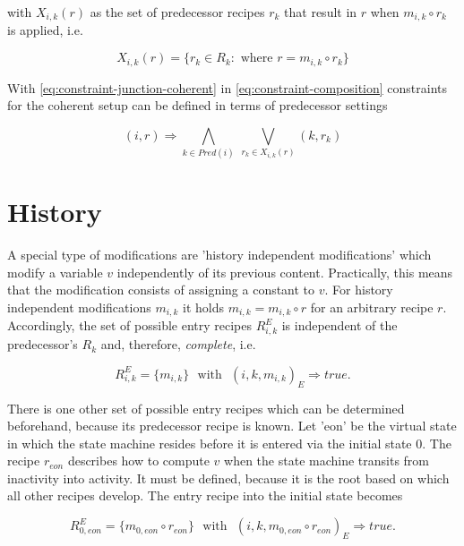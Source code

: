 \documentclass[12pt,a4paper]{scrartcl}
\begin{document}
with $X_{i,k}(r)$ as the set of predecessor recipes $r_k$ that result in $r$
when $m_{i,k}\circ r_k$ is applied, i.e.

\begin{equation} \label{eq:condition-result-origin-set}
    X_{i,k}(r) = \{ r_k\in R_k: \mbox{ where } r = m_{i,k}\circ r_k \}
\end{equation}

With \eqref{eq:constraint-junction-coherent} in
\eqref{eq:constraint-composition} constraints for the coherent setup can be
defined in terms of predecessor settings

\begin{equation} \label{eq:recipe-constraints-recursively}
    (i, r) \Rightarrow \bigwedge_{k\in Pred(i)} \
                       \bigvee_{r_k\in X_{i,k}(r)} (k,r_k)
\end{equation}

\section{History} %

A special type of modifications are 'history independent modifications' which
modify a variable $v$ independently of its previous content. Practically, this
means that the modification consists of assigning a constant to $v$. For
history independent modifications $m_{i,k}$ it holds $m_{i,k}=m_{i,k}\circ r$
for an arbitrary recipe $r$.  Accordingly, the set of possible entry recipes
$R^E_{i,k}$ is independent of the predecessor's $R_k$ and, therefore,
\textit{complete}, i.e.

\begin{equation}
    R^E_{i,k} = \{ m_{i,k} \} \,\, \mbox{ with } \,\, (i,k,m_{i,k})_E \Rightarrow true.
\end{equation}

There is one other set of possible entry recipes which can be determined
beforehand, because its predecessor recipe is known. Let 'eon' be the virtual
state in which the state machine resides before it is entered via the initial
state $0$.  The recipe $r_{eon}$ describes how to compute $v$ when the state
machine transits from inactivity into activity. It must be defined, because it
is the root based on which all other recipes develop. The entry recipe into the
initial state becomes

\begin{equation}
    R^E_{0,eon} = \{ m_{0,eon}\circ r_{eon} \} \,\, \mbox{ with } \,\, (i,k,m_{0,eon}\circ r_{eon})_E \Rightarrow true.
\end{equation}
\end{document}
